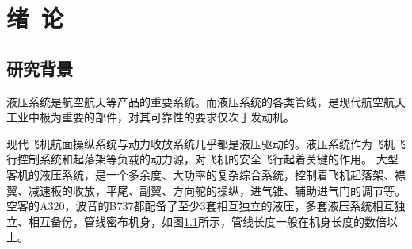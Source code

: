 


\chapter{绪~论}


\section{研究背景}

液压系统是航空航天等产品的重要系统。而液压系统的各类管线，是现代航空航天工业中极为重要的部件，对其可靠性的要求仅次于发动机。

现代飞机航面操纵系统与动力收放系统几乎都是液压驱动的。液压系统作为飞机飞行控制系统和起落架等负载的动力源，对飞机的安全飞行起着关键的作用。
大型客机的液压系统，是一个多余度、大功率的复杂综合系统，控制着飞机起落架、襟翼、减速板的收放，平尾、副翼、方向舵的操纵，进气锥、辅助进气门的调节等\cite{dingfei2010}。空客的A320，波音的B737都配备了至少3套相互独立的液压\cite{dingfei2010}，多套液压系统相互独立、相互备份，管线密布机身，如图\ref{fig:plane-hose}所示，管线长度一般在机身长度的数倍以上。




\begin{figure}[!htbp]
	\centering
	\hspace{1cm}
	\label{fig:plane-hose}
	
\end{figure}




